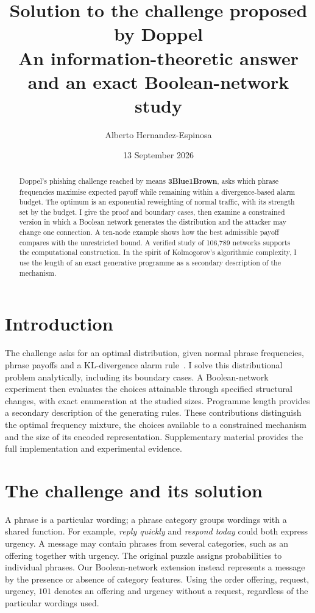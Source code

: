 \documentclass[11pt,a4paper]{article}
\title{Solution to the challenge proposed by Doppel\\[5pt]
  \large An information-theoretic answer and an exact Boolean-network study}
\author{Alberto Hernandez-Espinosa}
\date{13 September 2026}
\begin{document}
\maketitle

\begin{abstract}
Doppel's phishing challenge reached by means \textbf{3Blue1Brown}, asks which phrase frequencies maximise expected
payoff while remaining within a divergence-based alarm budget. The optimum
is an exponential reweighting of normal traffic, with its strength set by
the budget. I give the proof and boundary cases, then examine a constrained
version in which a Boolean network generates the distribution and the
attacker may change one connection. A ten-node example shows how the best
admissible payoff compares with the unrestricted bound. A verified study of
106,789 networks supports the computational construction. In the spirit
of Kolmogorov's algorithmic complexity, I use the length of an exact
generative programme as a secondary description of the mechanism.
\end{abstract}

\section{Introduction}
The challenge asks for an optimal distribution, given normal phrase
frequencies, phrase payoffs and a KL-divergence alarm rule~\cite{challenge}.
I solve this distributional problem analytically, including its boundary
cases. A Boolean-network experiment then evaluates the choices attainable
through specified structural changes, with exact enumeration at the
studied sizes. Programme length provides a secondary description of the
generating rules. These contributions distinguish the optimal frequency
mixture, the choices available to a constrained mechanism and the size of
its encoded representation. Supplementary material provides the full
implementation and experimental evidence.

\section{The challenge and its solution}
A phrase is a particular wording; a phrase category groups wordings
with a shared function. For example, \emph{reply quickly} and \emph{respond
today} could both express urgency. A message may contain phrases from
several categories, such as an offering together with urgency.
The original puzzle assigns probabilities to individual phrases.
Our Boolean-network extension instead represents a message by the
presence or absence of category features. Using the order offering,
request, urgency, $101$ denotes an offering and urgency without a request,
regardless of the particular wordings used.
\end{document}
